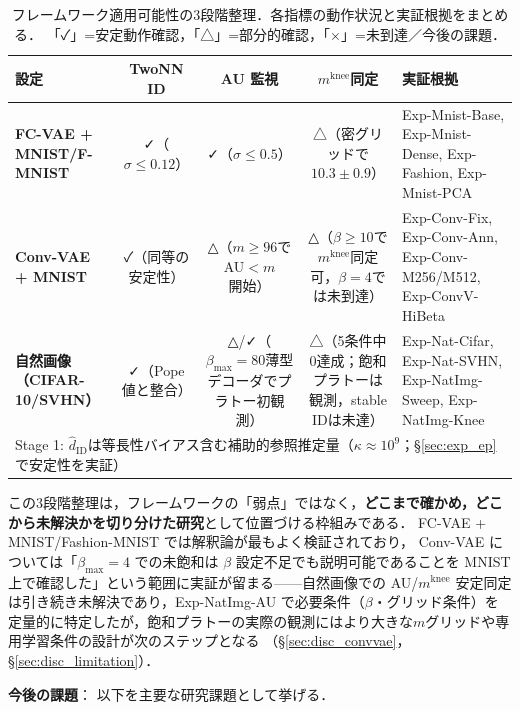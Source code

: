 \documentclass[11pt,a4paper]{jsarticle}
\newcommand{\kap}{\kappa}
\newcommand{\mknee}{m^{\mathrm{knee}}}
\begin{document}
\begin{table}[H]
\centering
\caption{フレームワーク適用可能性の3段階整理．各指標の動作状況と実証根拠をまとめる．
「✓」=安定動作確認，「△」=部分的確認，「×」=未到達／今後の課題．}
\label{tab:applicability_tier}
\small
\begin{tabular}{lcccp{3.8cm}}
\toprule
設定 & TwoNN ID & AU 監視 & $\mknee$同定 & 実証根拠 \\
\midrule
\textbf{FC-VAE + MNIST/F-MNIST}
  & ✓（$\sigma\leq0.12$）
  & ✓（$\sigma\leq0.5$）
  & △（密グリッドで$10.3\pm0.9$）
  & Exp-Mnist-Base, Exp-Mnist-Dense, Exp-Fashion, Exp-Mnist-PCA \\
\addlinespace
\textbf{Conv-VAE + MNIST}
  & ✓（同等の安定性）
  & △（$m\geq96$で AU$<m$開始）
  & △（$\beta\geq10$で$\mknee$同定可，$\beta=4$では未到達）
  & Exp-Conv-Fix, Exp-Conv-Ann, Exp-Conv-M256/M512, Exp-ConvV-HiBeta \\
\addlinespace
\textbf{自然画像（CIFAR-10/SVHN）}
  & ✓（Pope値と整合）
  & △/✓（$\beta_{\max}=80$薄型デコーダでプラトー初観測）
  & △（5条件中0達成；飽和プラトーは観測，stable IDは未達）
  & Exp-Nat-Cifar, Exp-Nat-SVHN, Exp-NatImg-Sweep, Exp-NatImg-Knee \\
\midrule
\multicolumn{5}{l}{\small Stage 1: $\hat{d}_\mathrm{ID}$は等長性バイアス含む補助的参照推定量（$\kap\approx10^9$；§\ref{sec:exp_ep}で安定性を実証）}\\
\bottomrule
\end{tabular}
\end{table}

この3段階整理は，フレームワークの「弱点」ではなく，\textbf{どこまで確かめ，どこから未解決かを切り分けた研究}として位置づける枠組みである．
FC-VAE + MNIST/Fashion-MNIST では解釈論が最もよく検証されており，
Conv-VAE については「$\beta_{\max}=4$ での未飽和は $\beta$ 設定不足でも説明可能であることを MNIST 上で確認した」という範囲に実証が留まる——自然画像での AU/$\mknee$ 安定同定は引き続き未解決であり，Exp-NatImg-AU で必要条件（$\beta$・グリッド条件）を定量的に特定したが，飽和プラトーの実際の観測にはより大きな$m$グリッドや専用学習条件の設計が次のステップとなる
（§\ref{sec:disc_convvae}，§\ref{sec:disc_limitation}）．

\textbf{今後の課題}：
以下を主要な研究課題として挙げる．
\end{document}
